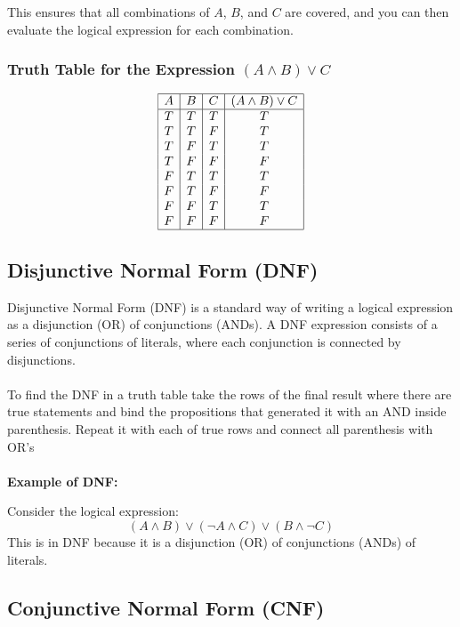 This ensures that all combinations of \(A\), \(B\), and \(C\) are covered, and you can then evaluate the logical expression for each combination.

\subsubsection*{Truth Table for the Expression \( (A \land B) \lor C \)}

\[
	\begin{array}{|c|c|c|c|}
		\hline
		A & B & C & (A \land B) \lor C \\
		\hline
		T & T & T & T                  \\
		T & T & F & T                  \\
		T & F & T & T                  \\
		T & F & F & F                  \\
		F & T & T & T                  \\
		F & T & F & F                  \\
		F & F & T & T                  \\
		F & F & F & F                  \\
		\hline
	\end{array}
\]

\subsection{Disjunctive Normal Form (DNF)}

Disjunctive Normal Form (DNF) is a standard way of writing a logical expression as a disjunction
(OR) of conjunctions (ANDs). A DNF expression consists of a series of
conjunctions of literals, where each conjunction is connected by disjunctions.
\\\\
To find the DNF in a truth table take the rows of the final result where there are
true statements and bind the propositions that generated it with an AND inside parenthesis.
Repeat it with each of true rows and connect all parenthesis with OR's
\\\\
\textbf{Example of DNF:}

Consider the logical expression:
\[
	(A \land B) \lor (\neg A \land C) \lor (B \land \neg C)
\]
This is in DNF because it is a disjunction (OR) of conjunctions (ANDs) of literals.

\subsection{Conjunctive Normal Form (CNF)}

